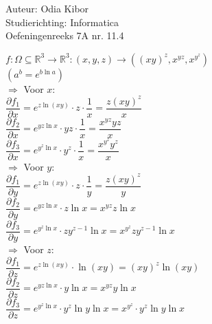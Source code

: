 \documentclass[a4paper]{article}
\begin{document}
  
\noindent \large Auteur: Odia Kibor \\
\noindent \large Studierichting: Informatica\\
\noindent \large Oefeningenreeks 7A nr. 11.4
\\

\medskip

\normalsize


$f:\Omega \subseteq \mathbb{R}^3 \rightarrow \mathbb{R}^3 : (x,y,z) \rightarrow \left((xy)^z, x^{yz},x^{y^z}\right)$\\

$(a^b = e^{b\ln a})$\\

$\Rightarrow$ Voor $x$:\\

$\dfrac{\partial f_1}{\partial x} =  e^{z\ln(xy)} \cdot z \cdot \dfrac{1}{x} = \dfrac{z(xy)^z}{x}$\\

$\dfrac{\partial f_2}{\partial x} = e^{yz \ln x} \cdot yz \cdot \dfrac{1}{x} = \dfrac{x^{yz}yz}{x}$\\

$\dfrac{\partial f_3}{\partial x} = e^{y^z\ln x} \cdot y^z \cdot \dfrac{1}{x} = \dfrac{x^{y^z}y^z}{x}$\\

$\Rightarrow$ Voor $y$:\\

$\dfrac{\partial f_1}{\partial y} = e^{z\ln(xy)} \cdot z \cdot \dfrac{1}{y} = \dfrac{z(xy)^z}{y}$\\

$\dfrac{\partial f_2}{\partial y} = e^{yz \ln x} \cdot z\ln x = x^{yz}z\ln x$\\

$\dfrac{\partial f_3}{\partial y} = e^{y^z\ln x} \cdot zy^{z-1} \ln x = x^{y^z} zy^{z-1} \ln x$\\

$\Rightarrow$ Voor $z$:\\

$\dfrac{\partial f_1}{\partial z} = e^{z\ln(xy)} \cdot \ln (xy) = (xy)^z \ln (xy)$\\

$\dfrac{\partial f_2}{\partial z} = e^{yz \ln x} \cdot y\ln x = x^{yz}y\ln x$\\

$\dfrac{\partial f_3}{\partial z} = e^{y^z\ln x} \cdot y^z \ln y \ln x = x^{y^z} \cdot y^z \ln y \ln x$\\
\end{document}
